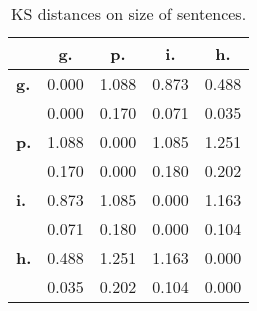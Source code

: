 \begin{table}[h!]
\begin{center}
\begin{tabular}{| l || c | c | c | c |}\hline
 & {\bf g.} & {\bf p.} & {\bf i.} & {\bf h.} \\\hline\hline
{\bf g.} & 0.000 & 1.088 & 0.873 & 0.488 \\
{\bf } & 0.000 & 0.170 & 0.071 & 0.035 \\\hline
{\bf p.} & 1.088 & 0.000 & 1.085 & 1.251 \\
{\bf } & 0.170 & 0.000 & 0.180 & 0.202 \\\hline
{\bf i.} & 0.873 & 1.085 & 0.000 & 1.163 \\
{\bf } & 0.071 & 0.180 & 0.000 & 0.104 \\\hline
{\bf h.} & 0.488 & 1.251 & 1.163 & 0.000 \\
{\bf } & 0.035 & 0.202 & 0.104 & 0.000 \\\hline
\end{tabular}
\caption{KS distances on size of sentences.}
\end{center}
\end{table}